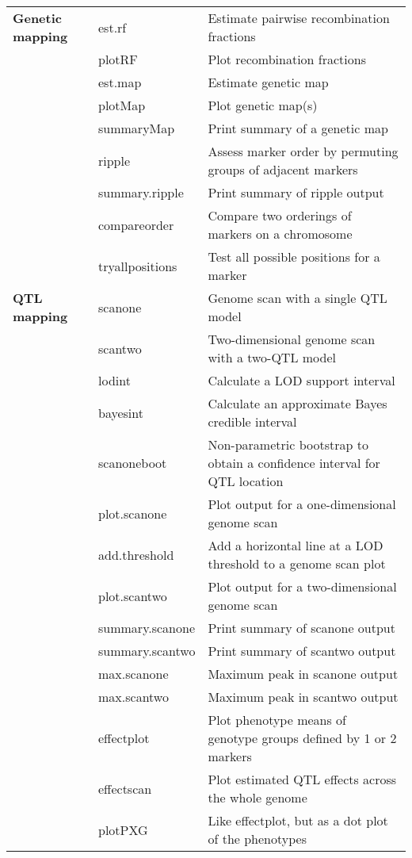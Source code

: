 \documentclass[10pt,letterpaper]{article}
\begin{document}
\noindent \begin{tabular}{lll} 
\hspace*{35mm} & \hspace*{25mm} & \hspace*{103mm} \\ 
\hline

\textbf{Genetic mapping} 
& est.rf & Estimate pairwise recombination fractions \\ 
& plotRF & Plot recombination fractions \\ 
& est.map & Estimate genetic map \\
& plotMap & Plot genetic map(s) \\
& summaryMap & Print summary of a genetic map \\
& ripple & Assess marker order by permuting groups of adjacent
markers \\
& summary.ripple & Print summary of ripple output \\ 
& compareorder & Compare two orderings of markers on a chromosome \\
& tryallpositions & Test all possible positions for a marker \\
\hline

\textbf{QTL mapping} 
& scanone & Genome scan with a single QTL model \\
& scantwo & Two-dimensional genome scan with a two-QTL model \\
& lodint & Calculate a LOD support interval \\
& bayesint & Calculate an approximate Bayes credible interval \\
& scanoneboot & Non-parametric bootstrap to obtain a confidence
interval for QTL location \\
& plot.scanone & Plot output for a one-dimensional genome scan \\
& add.threshold & Add a horizontal line at a LOD threshold to a genome scan plot \\
& plot.scantwo & Plot output for a two-dimensional genome scan \\ 
& summary.scanone & Print summary of scanone output \\
& summary.scantwo & Print summary of scantwo output \\ 
& max.scanone & Maximum peak in scanone output \\
& max.scantwo & Maximum peak in scantwo output \\
& effectplot & Plot phenotype means of genotype groups defined
by 1 or 2 markers \\
& effectscan & Plot estimated QTL effects across the whole genome \\
& plotPXG & Like effectplot, but as a dot plot of the phenotypes \\ 
\hline


\end{tabular}
\end{document}
